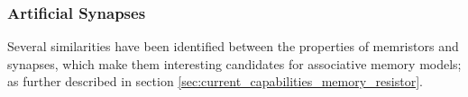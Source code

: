 \subsubsection{Artificial Synapses}


Several similarities have been identified between the properties of memristors and synapses, which make them interesting candidates for associative memory models; as further described in section \ref{sec:current_capabilities_memory_resistor}.


%



%



%



%



%

